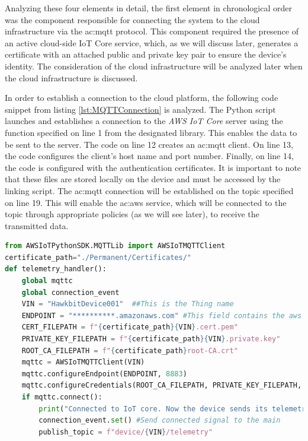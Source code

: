 Analyzing these four elements in detail, the first element in chronological order was the component responsible for connecting the system to the cloud infrastructure via the \gls{ac:mqtt} protocol. This component required the presence of an active cloud-side IoT Core service, which, as we will discuss later, generates a certificate with an attached public and private key pair to ensure the device's identity. The consideration of the cloud infrastructure will be analyzed later when the cloud infrastructure is discussed.

In order to establish a connection to the cloud platform, the following code snippet from listing \ref{lst:MQTTConnection} is analyzed. The Python script launches and establishes a connection to the \textit{AWS IoT Core} server using the function specified on line 1 from the designated library. This enables the data to be sent to the server. The code on line 12 creates an \gls{ac:mqtt} client. On line 13, the code configures the client's host name and port number. Finally, on line 14, the code is configured with the authentication certificates. It is important to note that these files are stored locally on the device and must be accessed by the linking script. The \gls{ac:mqtt} connection will be established on the topic specified on line 19. This will enable the \gls{ac:aws} service, which will be connected to the topic through appropriate policies (as we will see later), to receive the transmitted data.

\begin{lstlisting}[language=Python, caption={\gls{ac:mqtt} connection to the \textit{AWS IoT Core} \gls{ac:aws} service}, label=lst:MQTTConnection, linerange={1-23}]
from AWSIoTPythonSDK.MQTTLib import AWSIoTMQTTClient
certificate_path="./Permanent/Certificates/"
def telemetry_handler():
    global mqttc
    global connection_event
    VIN = "HawkbitDevice001"  ##This is the Thing name
    ENDPOINT = "**********.amazonaws.com" #This field contains the aws region
    CERT_FILEPATH = f"{certificate_path}{VIN}.cert.pem"
    PRIVATE_KEY_FILEPATH = f"{certificate_path}{VIN}.private.key"
    ROOT_CA_FILEPATH = f"{certificate_path}root-CA.crt"
    mqttc = AWSIoTMQTTClient(VIN)
    mqttc.configureEndpoint(ENDPOINT, 8883)
    mqttc.configureCredentials(ROOT_CA_FILEPATH, PRIVATE_KEY_FILEPATH, CERT_FILEPATH)
    if mqttc.connect():
        print("Connected to IoT core. Now the device sends its telemetry every 1 seconds")
        connection_event.set() #Send connected signal to the main
        publish_topic = f"device/{VIN}/telemetry"
\end{lstlisting}

